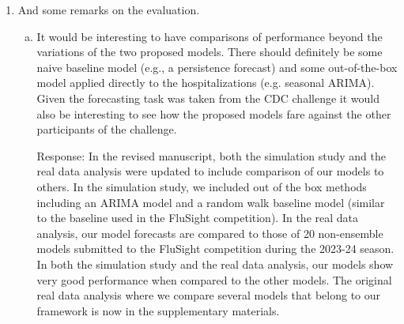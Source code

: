 \documentclass{article}
\newcommand{\spencer}[1]{{\color{red} Response: #1}}
\begin{document}
\begin{enumerate}[1.]
\begin{enumerate}[a.]
{`` We found that models
 with more than 1 autoregressive lag showed 
 little or no forecast improvement over 1 lag.``}

\item On page 14 it says: "all negative values of [...] were set to 0 to reflect realistic values of
hospitalizations". Could this be handled more naturally by appropriate distributional assumptions?

\spencer{We tried both fitting log-hospitalizations as well as assuming 
hospitalizations followed a distribution truncated at 0, but this led to
poorer forecasts or problems fitting the posterior distribution. We make this
statement in the revised manuscript:

``The sample $\{H^*_{s,w + i}\}^K$ was then used as the probabilistic forecast 
for hospitalizations at week $w + i$. 
Occasionally $\{H^*_{s,w + i}\}^K$ included a small number of negative values,
which do not make sense when the distribution is meant to forecast
hospitalizations, a nonnegative number. We attempted to alleviate this problem
by modeling log-hospitalizations or by assuming hospitalizations followed a
distribution truncated at 0, but these models led to poorer forecasts
and issues drawing from the posterior distribution.
For the forecast competition analysis in 
section 5, all negative values of $\{H^*_{s,w + i}\}^K$ were 
set to 0 to reflect realistic values of hospitalizations and comply with the 
FluSight forecasting rules.``}

\end{enumerate}


\item And some remarks on the evaluation.

\begin{enumerate}[a.]

\item It would be interesting to have comparisons of performance beyond the variations of the two
proposed models. There should definitely be some naive baseline model (e.g., a persistence
forecast) and some out-of-the-box model applied directly to the hospitalizations (e.g. seasonal
ARIMA). Given the forecasting task was taken from the CDC challenge it would also be interesting
to see how the proposed models fare against the other participants of the challenge.


\spencer{In the revised manuscript, 
both the simulation study and the real data analysis were updated to include
comparison of our models to others. In the simulation study, we included out 
of the box methods including an ARIMA model and a random walk baseline model
(similar to the baseline used in the FluSight competition).
In the real data analysis, our model forecasts are compared to those of 20
non-ensemble models submitted to the FluSight competition during the 2023-24
season. In both the simulation study and the real data analysis, 
our models show very good performance when compared to the other models. 
The original real data analysis where we compare several models that
belong to our framework is now in the supplementary materials.}




\end{enumerate}
\end{enumerate}
\end{document}
